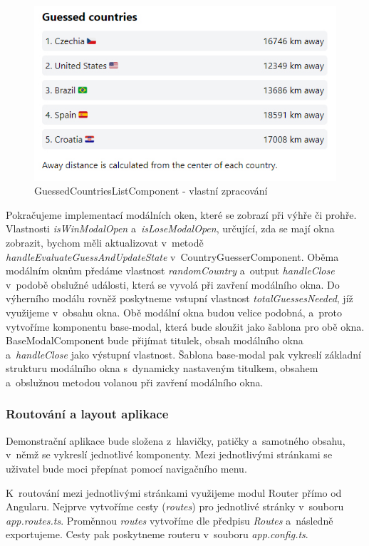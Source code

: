 \begin{figure}[htb]
	\centering
		\includegraphics[width=.7\textwidth]{images/GuessedCountriesList.jpg}
	\caption[GuessedCountriesListComponent]{GuessedCountriesListComponent - vlastní zpracování}
	\label{fig:angularguessedcountrieslist}
\end{figure}

Pokračujeme implementací modálních oken, které se zobrazí při výhře či prohře. 
Vlastnosti \emph{isWinModalOpen} a~\emph{isLoseModalOpen}, určující, zda se mají okna zobrazit, bychom měli aktualizovat v~metodě \emph{handleEvaluateGuessAndUpdateState} v~CountryGuesserComponent. 
Oběma modálním oknům předáme vlastnost \emph{randomCountry} a~output \emph{handleClose} v~podobě obslužné události, která se vyvolá při zavření modálního okna. 
Do výherního modálu rovněž poskytneme vstupní vlastnost \emph{totalGuessesNeeded}, jíž využijeme v~obsahu okna. 
Obě modální okna budou velice podobná, a~proto vytvoříme komponentu base-modal, která bude sloužit jako šablona pro obě okna. 
BaseModalComponent bude přijímat titulek, obsah modálního okna a~\emph{handleClose} jako výstupní vlastnost. 
Šablona base-modal pak vykreslí základní strukturu modálního okna s~dynamicky nastaveným titulkem, obsahem a~obslužnou metodou volanou při zavření modálního okna.

\subsubsection*{Routování a layout aplikace}

Demonstrační aplikace bude složena z~hlavičky, patičky a~samotného obsahu, v~němž se vykreslí jednotlivé komponenty. 
Mezi jednotlivými stránkami se uživatel bude moci přepínat pomocí navigačního menu.

K~routování mezi jednotlivými stránkami využijeme modul Router přímo od Angularu. Nejprve vytvoříme cesty (\emph{routes}) pro jednotlivé stránky v~souboru \emph{app.routes.ts}. 
Proměnnou \emph{routes} vytvoříme dle předpisu \emph{Routes} a~následně exportujeme. Cesty pak poskytneme routeru v~souboru \emph{app.config.ts}.

